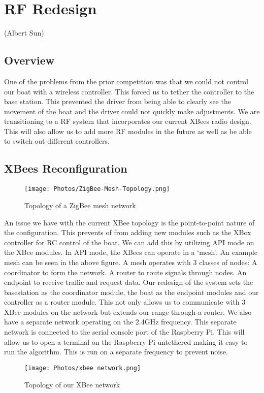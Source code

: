 \documentclass{article}
\begin{document}
\section{RF Redesign}
(Albert Sun)
\subsection{Overview}

One of the problems from the prior competition was that we could not control our boat with a wireless controller. This forced us to tether the controller to the base station. This prevented the driver from being able to clearly see the movement of the boat and the driver could not quickly make adjustments. We are transitioning to a RF system that incorporates our current XBees radio design. This will also allow us to add more RF modules in the future as well as be able to switch out different controllers.

\subsection{XBees Reconfiguration}
\begin{figure}[htp]
    \centering
    \texttt{[image: Photos/ZigBee-Mesh-Topology.png]}
    \caption{Topology of a ZigBee mesh network}
    \label{fig:Photos/ZigBee-Mesh-Topology.png}
\end{figure}
An issue we have with the current XBee topology is the point-to-point nature of the configuration. This prevents of from adding new modules such as the XBox controller for RC control of the boat. We can add this by utilizing API mode on the XBee modules. In API mode, the XBees can operate in a ‘mesh’. An example mesh can be seen in the above figure. A mesh operates with 3 classes of nodes: A coordinator to form the network. A router to route signals through nodes. An endpoint to receive traffic and request data. Our redesign of the system sets the basestation as the coordinator module, the boat as the endpoint modules and our controller as a router module. This not only allows us to communicate with 3 XBee modules on the network but extends our range through a router. We also have a separate network operating on the 2.4GHz frequency. This separate network is connected to the serial console port of the Raspberry Pi. This will allow us to open a terminal on the Raspberry Pi untethered making it easy to run the algorithm. This is run on a separate frequency to prevent noise.

\begin{figure}[htp]
    \centering
    \texttt{[image: Photos/xbee network.png]}
    \caption{Topology of our XBee network}
    \label{Photos/fig:xbee network.png}
\end{figure}
\end{document}
